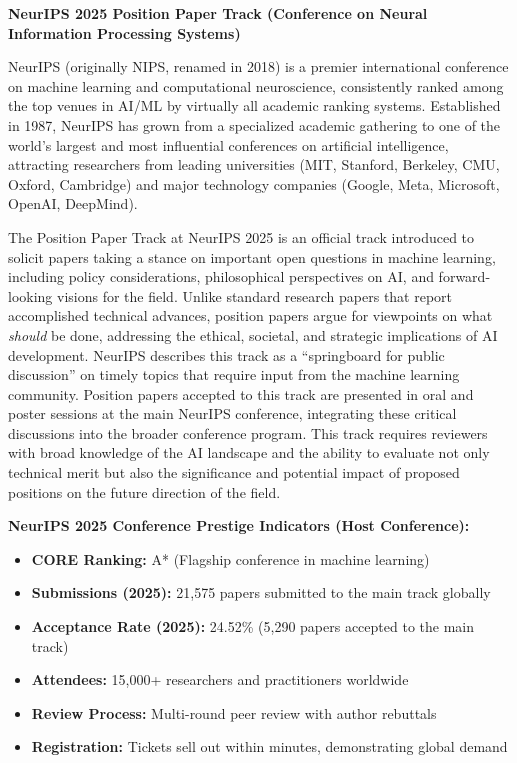 \textbf{NeurIPS 2025 Position Paper Track (Conference on Neural Information Processing Systems)}

NeurIPS (originally NIPS, renamed in 2018) is a premier international conference on machine learning and computational neuroscience, consistently ranked among the top venues in AI/ML by virtually all academic ranking systems. Established in 1987, NeurIPS has grown from a specialized academic gathering to one of the world's largest and most influential conferences on artificial intelligence, attracting researchers from leading universities (MIT, Stanford, Berkeley, CMU, Oxford, Cambridge) and major technology companies (Google, Meta, Microsoft, OpenAI, DeepMind).

The Position Paper Track at NeurIPS 2025 is an official track introduced to solicit papers taking a stance on important open questions in machine learning, including policy considerations, philosophical perspectives on AI, and forward-looking visions for the field. Unlike standard research papers that report accomplished technical advances, position papers argue for viewpoints on what \textit{should} be done, addressing the ethical, societal, and strategic implications of AI development. NeurIPS describes this track as a ``springboard for public discussion'' on timely topics that require input from the machine learning community. Position papers accepted to this track are presented in oral and poster sessions at the main NeurIPS conference, integrating these critical discussions into the broader conference program. This track requires reviewers with broad knowledge of the AI landscape and the ability to evaluate not only technical merit but also the significance and potential impact of proposed positions on the future direction of the field.

\textbf{NeurIPS 2025 Conference Prestige Indicators (Host Conference):}
\begin{itemize}
    \item \textbf{CORE Ranking:} A* (Flagship conference in machine learning)
    \item \textbf{Submissions (2025):} 21,575 papers submitted to the main track globally
    \item \textbf{Acceptance Rate (2025):} 24.52\% (5,290 papers accepted to the main track)
    \item \textbf{Attendees:} 15,000+ researchers and practitioners worldwide
    \item \textbf{Review Process:} Multi-round peer review with author rebuttals
    \item \textbf{Registration:} Tickets sell out within minutes, demonstrating global demand
\end{itemize}


